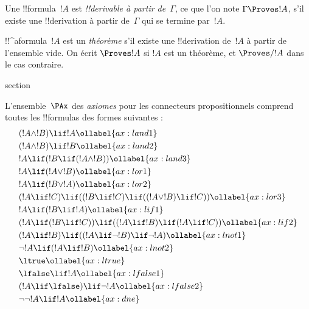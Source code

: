 \documentclass[11pt,a4paper,openany]{memoir}
\begin{document}
\begin{defn}[!!^{derivability}]
Une !!{formula}~$!A$ est \emph{!!{derivable} à partir de~$\Gamma$}, ce
que l'on note $\Gamma \Proves !A$, s'il existe une !!{derivation} à
partir de~$\Gamma$ qui se termine par~$!A$.
\end{defn}

\begin{defn}[Théorèmes]
!!^a{formula}~$!A$ est un \emph{théorème} s'il existe une
!!{derivation} de~$!A$ à partir de l'ensemble vide. On écrit
$\Proves !A$ si $!A$ est un théorème, et $\Proves/ !A$ dans le cas
contraire.
\end{defn}


\endgroup



\begingroup
\expandafter\def\csname ol@sectioncs\endcsname{section}
\def\olfilename{axioms-rules-propositional}


      {}
      {}


\begin{defn}[Axiomes]
L'ensemble~$\PAx$ des \emph{axiomes} pour les connecteurs
propositionnels comprend toutes les !!{formula}s des formes suivantes :
\begin{align}
  & (!A \land !B) \lif !A \ollabel{ax:land1}\\
  & (!A \land !B) \lif !B \ollabel{ax:land2}\\
  & !A \lif (!B \lif (!A \land !B)) \ollabel{ax:land3}\\
  & !A \lif (!A \lor !B) \ollabel{ax:lor1}\\
  & !A \lif (!B \lor !A) \ollabel{ax:lor2}\\
  & (!A \lif !C) \lif ((!B \lif !C) \lif ((!A \lor !B) \lif !C)) \ollabel{ax:lor3}\\
  & !A \lif (!B \lif !A) \ollabel{ax:lif1}\\
  & (!A \lif (!B \lif !C)) \lif ((!A \lif !B) \lif (!A \lif !C)) \ollabel{ax:lif2}\\
  & (!A \lif !B) \lif ((!A \lif \lnot !B) \lif \lnot !A) \ollabel{ax:lnot1}\\
  & \lnot !A \lif (!A \lif !B) \ollabel{ax:lnot2}\\
  & \ltrue \ollabel{ax:ltrue}\\
  & \lfalse \lif !A \ollabel{ax:lfalse1}\\
  & (!A \lif \lfalse) \lif \lnot !A \ollabel{ax:lfalse2}\\
  & \lnot\lnot !A \lif !A \ollabel{ax:dne}
\end{align}
\end{defn}
\end{document}
